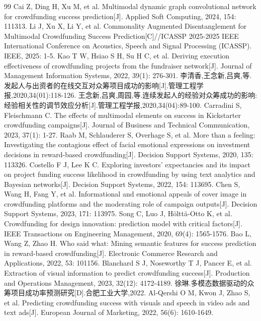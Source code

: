 \begin{thebibliography}{99}
 Cai Z, Ding H, Xu M, et al. Multimodal dynamic graph convolutional network for crowdfunding success prediction[J]. Applied Soft Computing, 2024, 154: 111313.
 Li J, Xu X, Li Y, et al. Commonality Augmented Disentanglement for Multimodal Crowdfunding Success Prediction[C]//ICASSP 2025-2025 IEEE International Conference on Acoustics, Speech and Signal Processing (ICASSP). IEEE, 2025: 1-5.
 Kao T W, Hsiao S H, Su H C, et al. Deriving execution effectiveness of crowdfunding projects from the fundraiser network[J]. Journal of Management Information Systems, 2022, 39(1): 276-301.
 李清香,王念新,吕爽,等.发起人与出资者的在线交互对众筹项目成功的影响[J].管理工程学报,2020,34(01):118-126.
 王念新,吕爽,周园,等.连续发起人的经验对众筹成功的影响:经验相关性的调节效应分析[J].管理工程学报,2020,34(04):89-100.
 Carradini S, Fleischmann C. The effects of multimodal elements on success in Kickstarter crowdfunding campaigns[J]. Journal of Business and Technical Communication, 2023, 37(1): 1-27.
 Raab M, Schlauderer S, Overhage S, et al. More than a feeling: Investigating the contagious effect of facial emotional expressions on investment decisions in reward-based crowdfunding[J]. Decision Support Systems, 2020, 135: 113326.
 Costello F J, Lee K C. Exploring investors' expectancies and its impact on project funding success likelihood in crowdfunding by using text analytics and Bayesian networks[J]. Decision Support Systems, 2022, 154: 113695.
 Chen S, Wang H, Fang Y, et al. Informational and emotional appeals of cover image in crowdfunding platforms and the moderating role of campaign outputs[J]. Decision Support Systems, 2023, 171: 113975.
 Song C, Luo J, Hölttä-Otto K, et al. Crowdfunding for design innovation: prediction model with critical factors[J]. IEEE Transactions on Engineering Management, 2020, 69(4): 1565-1576.
 Bao L, Wang Z, Zhao H. Who said what: Mining semantic features for success prediction in reward-based crowdfunding[J]. Electronic Commerce Research and Applications, 2022, 53: 101156.
 Blanchard S J, Noseworthy T J, Pancer E, et al. Extraction of visual information to predict crowdfunding success[J]. Production and Operations Management, 2023, 32(12): 4172-4189.
 徐琳.多模态数据驱动的众筹项目成功率预测研究[D].合肥工业大学,2022.
 Al-Qershi O M, Kwon J, Zhao S, et al. Predicting crowdfunding success with visuals and speech in video ads and text ads[J]. European Journal of Marketing, 2022, 56(6): 1610-1649.

\end{thebibliography}
